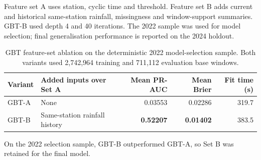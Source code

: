 Feature set A uses station, cyclic time and threshold. Feature set B adds
current and historical same-station rainfall, missingness and window-support
summaries. GBT-B used depth 4 and 40 iterations. The 2022 sample was used for
model selection; final generalisation performance is reported on the 2024
holdout.

\begin{table}[htbp]
\centering\small
\caption{GBT feature-set ablation on the deterministic 2022 model-selection
sample. Both variants used 2,742,964 training and 711,112 evaluation base
windows.}
\label{tab:feature-ablation}
\begin{tabular}{l l r r r}
\toprule
Variant & Added inputs over Set A & Mean PR-AUC & Mean Brier & Fit time (s) \\
\midrule
GBT-A & None & 0.03553 & 0.02286 & 319.7 \\
GBT-B & Same-station rainfall history & \textbf{0.52207} &
\textbf{0.01402} & 383.5 \\
\bottomrule
\end{tabular}
\end{table}

On the 2022 selection sample, GBT-B outperformed GBT-A, so Set B was retained
for the final model.

